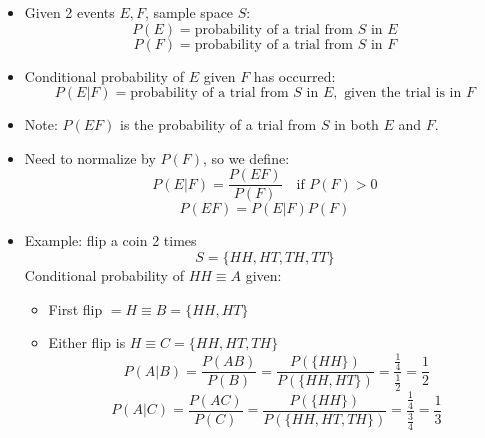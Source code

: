 \begin{itemize}
      \item Given 2 events $E, F$, sample space $S$:
            \[ P(E) = \text{probability of a trial from } S \text{ in } E \]
            \[ P(F) = \text{probability of a trial from } S \text{ in } F \]
      \item Conditional probability of $E$ given $F$ has occurred:
            \[ P(E|F) = \text{probability of a trial from } S \text{ in } E, \text{ given the trial is in } F \]
      \item Note: $P(EF)$ is the probability of a trial from $S$ in both $E$ and $F$.
      \item Need to normalize by $P(F)$, so we define:
            \[ P(E|F) = \frac{P(EF)}{P(F)} \quad \text{if } P(F) > 0 \]
            \[ P(EF) = P(E|F) P(F) \]

      \item Example: flip a coin 2 times
            \[ S = \{HH, HT, TH, TT\} \]
            Conditional probability of $HH \equiv A$ given:
            \begin{itemize}
                  \item First flip $= H \equiv B = \{HH, HT\}$
                  \item Either flip is $H \equiv C = \{HH, HT, TH\}$
                        \[ P(A|B) = \frac{P(AB)}{P(B)} = \frac{P(\{HH\})}{P(\{HH, HT\})} = \frac{\frac{1}{4}}{\frac{1}{2}} = \frac{1}{2} \]
                        \[ P(A|C) = \frac{P(AC)}{P(C)} = \frac{P(\{HH\})}{P(\{HH, HT, TH\})} = \frac{\frac{1}{4}}{\frac{3}{4}} = \frac{1}{3} \]
            \end{itemize}
\end{itemize}
